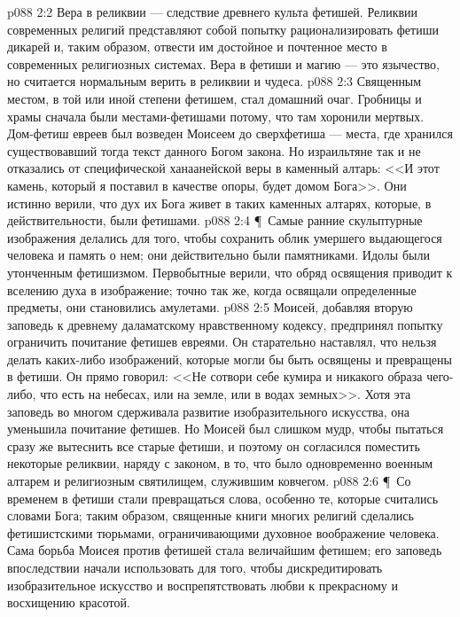\vs p088 2:2 Вера в реликвии --- следствие древнего культа фетишей. Реликвии современных религий представляют собой попытку рационализировать фетиши дикарей и, таким образом, отвести им достойное и почтенное место в современных религиозных системах. Вера в фетиши и магию --- это язычество, но считается нормальным верить в реликвии и чудеса.
\vs p088 2:3 Священным местом, в той или иной степени фетишем, стал домашний очаг. Гробницы и храмы сначала были местами\hyp{}фетишами потому, что там хоронили мертвых. Дом\hyp{}фетиш евреев был возведен Моисеем до сверхфетиша --- места, где хранился существовавший тогда текст данного Богом закона. Но израильтяне так и не отказались от специфической ханаанейской веры в каменный алтарь: <<И этот камень, который я поставил в качестве опоры, будет домом Бога>>. Они истинно верили, что дух их Бога живет в таких каменных алтарях, которые, в действительности, были фетишами.
\vs p088 2:4 \P\ Самые ранние скульптурные изображения делались для того, чтобы сохранить облик умершего выдающегося человека и память о нем; они действительно были памятниками. Идолы были утонченным фетишизмом. Первобытные верили, что обряд освящения приводит к вселению духа в изображение; точно так же, когда освящали определенные предметы, они становились амулетами.
\vs p088 2:5 Моисей, добавляя вторую заповедь к древнему даламатскому нравственному кодексу, предпринял попытку ограничить почитание фетишев евреями. Он старательно наставлял, что нельзя делать каких\hyp{}либо изображений, которые могли бы быть освящены и превращены в фетиши. Он прямо говорил: <<Не сотвори себе кумира и никакого образа чего\hyp{}либо, что есть на небесах, или на земле, или в водах земных>>. Хотя эта заповедь во многом сдерживала развитие изобразительного искусства, она уменьшила почитание фетишев. Но Моисей был слишком мудр, чтобы пытаться сразу же вытеснить все старые фетиши, и поэтому он согласился поместить некоторые реликвии, наряду с законом, в то, что было одновременно военным алтарем и религиозным святилищем, служившим ковчегом.
\vs p088 2:6 \P\ Со временем в фетиши стали превращаться слова, особенно те, которые считались словами Бога; таким образом, священные книги многих религий сделались фетишистскими тюрьмами, ограничивающими духовное воображение человека. Сама борьба Моисея против фетишей стала величайшим фетишем; его заповедь впоследствии начали использовать для того, чтобы дискредитировать изобразительное искусство и воспрепятствовать любви к прекрасному и восхищению красотой.
